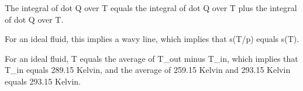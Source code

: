 The integral of dot Q over T equals the integral of dot Q over T plus the integral of dot Q over T.

For an ideal fluid, this implies a wavy line, which implies that s(T/p) equals s(T).

For an ideal fluid, T equals the average of T_out minus T_in, which implies that T_in equals 289.15 Kelvin, and the average of 259.15 Kelvin and 293.15 Kelvin equals 293.15 Kelvin.